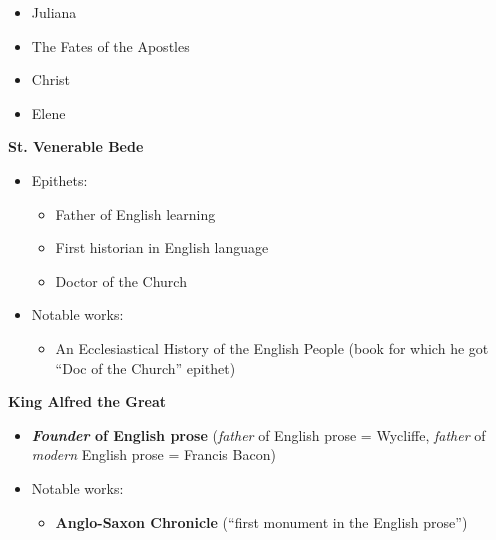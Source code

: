 \documentclass[
  12pt,
    progressbar=frametitle]{beamer}
\providecommand{\tightlist}{%
  \setlength{\itemsep}{0pt}\setlength{\parskip}{0pt}}
\begin{document}
\begin{frame}[allowframebreaks]
\begin{itemize}
  \begin{itemize}
  \tightlist
  \item
    Juliana
  \item
    The Fates of the Apostles
  \item
    Christ
  \item
    Elene
  \end{itemize}
\end{itemize}

\large\textbf{St. Venerable Bede}\normalsize\vspace{-3mm}

\begin{itemize}
\tightlist
\item
  Epithets:

  \begin{itemize}
  \tightlist
  \item
    Father of English learning
  \item
    First historian in English language
  \item
    Doctor of the Church
  \end{itemize}
\item
  Notable works:

  \begin{itemize}
  \tightlist
  \item
    An Ecclesiastical History of the English People (book for which he
    got ``Doc of the Church'' epithet)
  \end{itemize}
\end{itemize}

\large\textbf{King Alfred the Great}\normalsize\vspace{-3mm}

\begin{itemize}
\tightlist
\item
  \textbf{\emph{Founder} of English prose} (\emph{father} of English
  prose = Wycliffe, \emph{father} of \emph{modern} English prose =
  Francis Bacon)
\item
  Notable works:

  \begin{itemize}
  \tightlist
  \item
    \textbf{Anglo-Saxon Chronicle} (``first monument in the English
    prose'')
  \end{itemize}
\end{itemize}
\end{frame}
\end{document}

